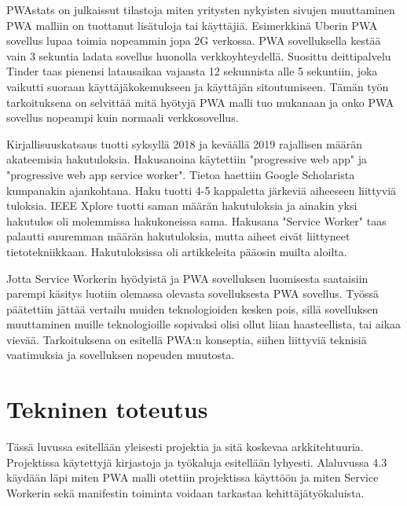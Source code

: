 \documentclass{tktltiki}
\begin{document}
PWAstats \cite{PWAstats} on julkaissut tilastoja miten yritysten nykyisten sivujen muuttaminen PWA malliin on tuottanut lisätuloja tai käyttäjiä. Esimerkkinä Uberin PWA sovellus lupaa toimia nopeammin jopa 2G verkossa. PWA sovelluksella kestää vain 3 sekuntia ladata sovellus huonolla verkkoyhteydellä. Suosittu deittipalvelu Tinder taas pienensi latausaikaa vajaasta 12 sekunnista alle 5 sekuntiin, joka vaikutti suoraan käyttäjäkokemukseen ja käyttäjän sitoutumiseen. Tämän työn tarkoituksena on selvittää mitä hyötyjä PWA malli tuo mukanaan ja onko PWA sovellus nopeampi kuin normaali verkkosovellus.

Kirjallisuuskatsaus tuotti syksyllä 2018 ja keväällä 2019 rajallisen määrän akateemisia hakutuloksia. Hakusanoina käytettiin "progressive web app" ja "progressive web app service worker". Tietoa haettiin Google Scholarista kumpanakin ajankohtana. Haku tuotti 4-5 kappaletta järkeviä aiheeseen liittyviä tuloksia.  IEEE Xplore tuotti saman määrän hakutuloksia ja ainakin yksi hakutulos oli molemmissa hakukoneissa sama. Hakusana "Service Worker" taas palautti suuremman määrän hakutuloksia, mutta aiheet eivät liittyneet tietotekniikkaan. Hakutuloksissa oli artikkeleita pääosin muilta aloilta. 

Jotta Service Workerin hyödyistä ja PWA sovelluksen luomisesta saataisiin parempi käsitys luotiin olemassa olevasta sovelluksesta PWA sovellus. Työssä päätettiin jättää vertailu muiden teknologioiden kesken pois, sillä sovelluksen muuttaminen muille teknologioille sopivaksi olisi ollut liian haasteellista, tai aikaa vievää. Tarkoituksena on esitellä PWA:n konseptia, siihen liittyviä teknisiä vaatimuksia ja sovelluksen nopeuden muutosta.

\newpage
\section{Tekninen toteutus}

Tässä luvussa esitellään yleisesti projektia ja sitä koskevaa arkkitehtuuria. Projektissa käytettyjä kirjastoja ja työkaluja esitellään lyhyesti. Alaluvussa 4.3 käydään läpi miten PWA malli otettiin projektissa käyttöön ja miten Service Workerin sekä manifestin toiminta voidaan tarkastaa kehittäjätyökaluista. 
\end{document}
